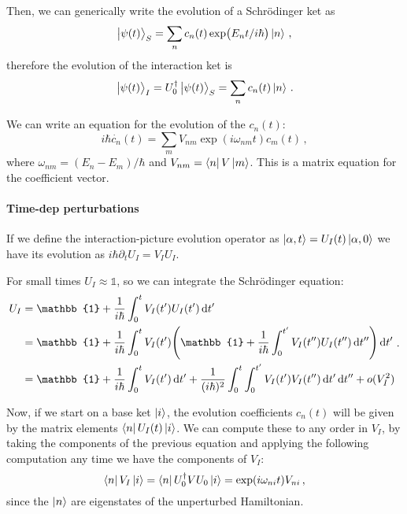 \documentclass[main.tex]{subfiles}
\begin{document}
Then, we can generically write the evolution of a Schrödinger ket as 
%
\begin{equation}
  \ket{\psi (t)}_S = 
  \sum _{n}  c_n(t) \exp(E_n t / i \hbar) \ket{n}
\,,
\end{equation}
%
therefore the evolution of the interaction ket is 
%
\begin{equation}
    \ket{\psi (t)}_I = 
    U_0 ^\dag \ket{\psi (t)} _S = \sum _n c_n (t) \ket{n} 
\,.
\end{equation}

We can write an equation for the evolution of the \(c_n(t)\): 
%
\begin{equation}
  i \hbar \dot{c_n} (t) = \sum_m V_{nm} \exp(i \omega_{nm} t) c_m(t) 
\,,
\end{equation}
%
where \(\omega_{nm} = (E_n - E_m) / \hbar\) and \(V_{nm} = \bra{n} V \ket{m} \). This is a matrix equation for the coefficient vector. 

\paragraph{Time-dep perturbations}

If we define the interaction-picture evolution operator as \(\ket{\alpha, t}  = U_I (t) \ket{\alpha, 0} \) we have its evolution as \(i \hbar \partial_t U_I = V_I U_I\).

For small times \(U_I \approx \mathbb{1}\), so we can integrate the Schrödinger equation: 
%
\begin{subequations}
    \begin{align}
        U_I &= \mathbb{1} + \frac{1}{i \hbar} \int_0^t V_I(t') U_I(t') \dd{t'}  \\
        &= \mathbb{1} + \frac{1}{i \hbar}\int_0^t V_I(t')\qty(
            \mathbb{1} + \frac{1}{i \hbar} \int_0^{t'} V_I(t'') U_I(t'') \dd{t''}
        ) \dd{t'}  \\
        &= \mathbb{1} + \frac{1}{i \hbar}\int_0^t V_I(t') \dd{t'} + \frac{1}{(i \hbar)^2} \int_0^t \int_0^{t'}V_I(t')V_I(t'') \dd{t'} \dd{t''} + o(V_I^2)
\end{align}
\,.
\end{subequations}
%

Now, if we start on a base ket \(\ket{i} \), the evolution coefficients \(c_n(t)\) will be given by the matrix elements \(\bra{n} U_I (t) \ket{i} \).
We can compute these to any order in \(V_I\), by taking the components of the previous equation and applying the following computation any time we have the components of \(V_I\): 
%
\begin{equation}
  \bra{n} V_I \ket{i} = \bra{n} U_0 ^\dag V U_0 \ket{i} = \exp(i \omega_{ni} t) V_{ni} 
\,,
\end{equation}
%
since the \(\ket{n} \) are eigenstates of the unperturbed Hamiltonian. 
\end{document}
